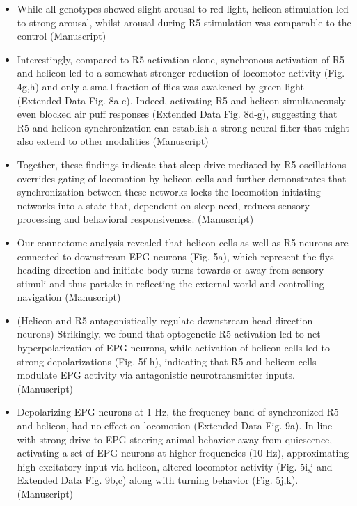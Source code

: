 \documentclass[11pt]{article}
\begin{document}
\begin{itemize}
    \item While all genotypes
    showed slight arousal to red light, helicon stimulation led to strong arousal, whilst arousal
    during R5 stimulation was comparable to the control
    \parencite{raccugliaCoherentMultilevelNetwork2022} (Manuscript)

    \item Interestingly, compared to R5 activation alone, synchronous activation of R5 and helicon led
    to a somewhat stronger reduction of locomotor activity (Fig. 4g,h) and only a small fraction of
    flies was awakened by green light (Extended Data Fig. 8a-c). Indeed, activating R5 and helicon
    simultaneously even blocked air puff responses (Extended Data Fig. 8d-g), suggesting that R5
    and helicon synchronization can establish a strong neural filter that might also extend to other
    modalities
    \parencite{raccugliaCoherentMultilevelNetwork2022} (Manuscript)

    \item Together, these findings indicate that sleep drive mediated by R5 oscillations overrides
    gating of locomotion by helicon cells and further demonstrates that synchronization between
    these networks locks the locomotion-initiating networks into a state that, dependent on sleep
    need, reduces sensory processing and behavioral responsiveness.
    \parencite{raccugliaCoherentMultilevelNetwork2022} (Manuscript)

    \item  Our connectome analysis revealed that helicon cells
    as well as R5 neurons are connected to downstream EPG neurons (Fig. 5a), which represent
    the flys heading direction and initiate body turns towards or away from sensory stimuli and
    thus partake in reflecting the external world and controlling navigation
    \parencite{raccugliaCoherentMultilevelNetwork2022} (Manuscript)

    \item (Helicon and R5 antagonistically regulate downstream head direction neurons) Strikingly, we found that
    optogenetic R5 activation led to net hyperpolarization of EPG neurons, while activation of
    helicon cells led to strong depolarizations (Fig. 5f-h), indicating that R5 and helicon cells
    modulate EPG activity via antagonistic neurotransmitter inputs.
    \parencite{raccugliaCoherentMultilevelNetwork2022} (Manuscript)

    \item Depolarizing EPG neurons at 1 Hz, the frequency band of synchronized R5 and helicon, had no
    effect on locomotion (Extended Data Fig. 9a). In line with strong drive to EPG steering animal
    behavior away from quiescence, activating a set of EPG neurons at higher frequencies (10 Hz),
    approximating high excitatory input via helicon, altered locomotor activity (Fig. 5i,j and
    Extended Data Fig. 9b,c) along with turning behavior (Fig. 5j,k).
    \parencite{raccugliaCoherentMultilevelNetwork2022} (Manuscript)


\end{itemize}
\end{document}
